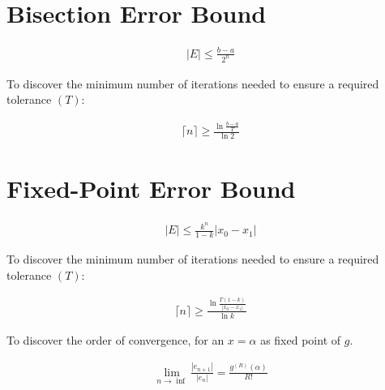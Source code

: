 \section{Bisection Error Bound}

	\begin{align}
		|E| \leq \frac{b-a}{2^{n}}
		\label{eq:bisectionerror}
	\end{align}

	To discover the minimum number of iterations needed to ensure a required tolerance $(T)$:

	\begin{align}
		\lceil n \rceil \geq \frac{\ln{\frac{b-a}{T}}}{\ln{2}}
		\label{eq:bisectiontolerance}
	\end{align}

\section{Fixed-Point Error Bound}

	\begin{align}
		|E| \leq \frac{k^{n}}{1-k}|x_{0} - x_{1}|
		\label{eq:fperror}
	\end{align}

	To discover the minimum number of iterations needed to ensure a required tolerance $(T)$:

	\begin{align}
		\lceil n \rceil \geq \frac{\ln{\frac{T(1-k)}{|x_{0} - x_{1}|}}}{\ln{k}}
		\label{eq:fptolerance}
	\end{align}

	To discover the order of convergence, for an $x = \alpha$ as fixed point of $g$.

	\begin{align}
		\lim_{n\to\inf} \frac{|e_{n+1}|}{|e_{n}|} = \frac{g^{(R)}(\alpha)}{R!}
		\label{eq:fptolerance}
	\end{align}
